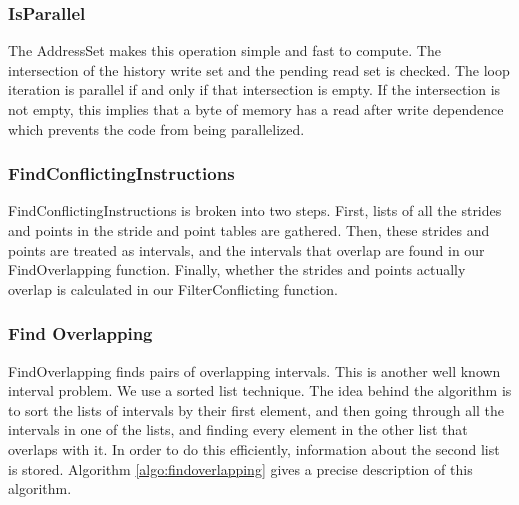 \documentclass[12pt,twoside]{reedthesis}
\begin{document}
		\subsubsection{IsParallel}
		
			The AddressSet makes this operation simple and fast to compute. The intersection of the history write set and the pending read set is checked. The loop iteration is parallel if and only if that intersection is empty. If the intersection is not empty, this implies that a byte of memory has a read after write dependence which prevents the code from  being parallelized. 
			
		\subsubsection{FindConflictingInstructions}
		
			FindConflictingInstructions is broken into two steps. First, lists of all the strides and points in the stride and point tables are gathered. Then, these strides and points are treated as intervals, and the intervals that overlap are found in our FindOverlapping function. Finally, whether the strides and points actually overlap is calculated in our FilterConflicting function. 
			
		\subsubsection{Find Overlapping}
		
			FindOverlapping finds pairs of overlapping intervals. This is another well known interval problem. We use a sorted list technique. 
			The idea behind the algorithm is to sort the lists of intervals by their first element, and then going through all the intervals in one of the lists, and finding every element in the other list that overlaps with it. In order to do this efficiently, information about the second list is stored. %
			Algorithm \ref{algo:findoverlapping} gives a precise description of this algorithm. %
			
\end{document}
